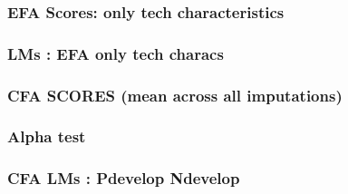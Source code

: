 \documentclass[
]{article}
\begin{document}
\hypertarget{efa-scores-only-tech-characteristics}{%
\subsubsection{EFA Scores: only tech
characteristics}\label{efa-scores-only-tech-characteristics}}

\hypertarget{lms-efa-only-tech-characs}{%
\subsubsection{LMs : EFA only tech
characs}\label{lms-efa-only-tech-characs}}

\hypertarget{cfa-scores-mean-across-all-imputations-1}{%
\subsubsection{CFA SCORES (mean across all
imputations)}\label{cfa-scores-mean-across-all-imputations-1}}

\hypertarget{alpha-test-2}{%
\subsubsection{Alpha test}\label{alpha-test-2}}

\hypertarget{cfa-lms-pdevelop-ndevelop}{%
\subsubsection{CFA LMs : Pdevelop
Ndevelop}\label{cfa-lms-pdevelop-ndevelop}}
\end{document}

